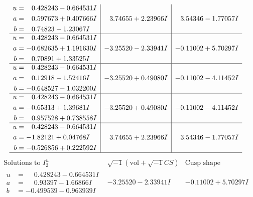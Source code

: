 \documentclass[1p]{elsarticle_modified}
\theoremstyle{definition}
\newcommand{\I}{\sqrt{-1}}
\begin{document}
$$\begin{array}{c|c|c}
\begin{aligned}
u &= \phantom{-}0.428243 - 0.664531 I \\
a &= \phantom{-}0.597673 + 0.407666 I \\
b &= \phantom{-}0.74823 - 1.23067 I\end{aligned}
 & \phantom{-}3.74655 + 2.23966 I & \phantom{-}3.54346 - 1.77057 I \\ \hline\begin{aligned}
u &= \phantom{-}0.428243 - 0.664531 I \\
a &= -0.682635 + 1.191630 I \\
b &= \phantom{-}0.70891 + 1.33525 I\end{aligned}
 & -3.25520 - 2.33941 I & -0.11002 + 5.70297 I \\ \hline\begin{aligned}
u &= \phantom{-}0.428243 - 0.664531 I \\
a &= \phantom{-}0.12918 - 1.52416 I \\
b &= -0.648527 - 1.032200 I\end{aligned}
 & -3.25520 + 0.49080 I & -0.11002 - 4.11452 I \\ \hline\begin{aligned}
u &= \phantom{-}0.428243 - 0.664531 I \\
a &= -0.65313 + 1.39681 I \\
b &= \phantom{-}0.957528 + 0.738558 I\end{aligned}
 & -3.25520 + 0.49080 I & -0.11002 - 4.11452 I \\ \hline\begin{aligned}
u &= \phantom{-}0.428243 - 0.664531 I \\
a &= -1.82121 + 0.04768 I \\
b &= -0.526856 + 0.222592 I\end{aligned}
 & \phantom{-}3.74655 + 2.23966 I & \phantom{-}3.54346 - 1.77057 I\\
 \hline 
 \end{array}$$\newpage$$\begin{array}{c|c|c}  
\text{Solutions to }I^u_{2}& \I (\text{vol} + \sqrt{-1}CS) & \text{Cusp shape}\\
 \hline 
\begin{aligned}
u &= \phantom{-}0.428243 - 0.664531 I \\
a &= \phantom{-}0.93397 - 1.66866 I \\
b &= -0.499539 - 0.963939 I\end{aligned}
 & -3.25520 - 2.33941 I & -0.11002 + 5.70297 I \\ \hline\begin{aligned}

\end{aligned}
\end{array}$$
\end{document}
